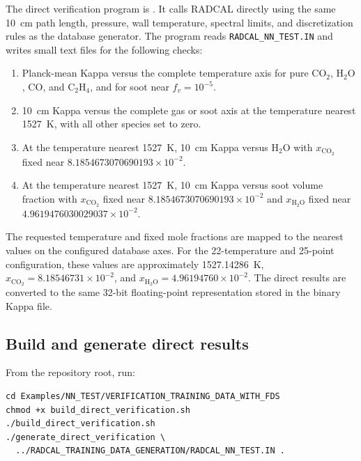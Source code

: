 \documentclass[11pt]{article}
\begin{document}
The direct verification program is
. It calls RADCAL directly using the same
10~cm path length, pressure, wall temperature, spectral limits, and
discretization rules as the database generator. The program reads
\texttt{RADCAL\_NN\_TEST.IN} and writes small text files for the following
checks:

\begin{enumerate}
   \item Planck-mean Kappa versus the complete temperature axis for pure
         \(\mathrm{CO_2}\), \(\mathrm{H_2O}\), \(\mathrm{CO}\), and
         \(\mathrm{C_2H_4}\), and for soot near \(f_v=10^{-5}\).
   \item 10~cm Kappa versus the complete gas or soot axis at the temperature
         nearest 1527~K, with all other species set to zero.
   \item At the temperature nearest 1527~K, 10~cm Kappa versus
         \(\mathrm{H_2O}\) with
         \(x_{\mathrm{CO_2}}\) fixed near
         \(8.1854673070690193\times10^{-2}\).
   \item At the temperature nearest 1527~K, 10~cm Kappa versus soot volume
         fraction with \(x_{\mathrm{CO_2}}\) fixed near
         \(8.1854673070690193\times10^{-2}\) and
         \(x_{\mathrm{H_2O}}\) fixed near
         \(4.9619476030029037\times10^{-2}\).
\end{enumerate}

The requested temperature and fixed mole fractions are mapped to the nearest
values on the configured database axes. For the 22-temperature and 25-point
configuration, these values are approximately 1527.14286~K,
\(x_{\mathrm{CO_2}}=8.18546731\times10^{-2}\), and
\(x_{\mathrm{H_2O}}=4.96194760\times10^{-2}\). The direct results are converted
to the same 32-bit floating-point representation stored in the binary Kappa
file.

\subsection{Build and generate direct results}

From the repository root, run:

\begin{verbatim}
cd Examples/NN_TEST/VERIFICATION_TRAINING_DATA_WITH_FDS
chmod +x build_direct_verification.sh
./build_direct_verification.sh
./generate_direct_verification \
  ../RADCAL_TRAINING_DATA_GENERATION/RADCAL_NN_TEST.IN .
\end{verbatim}
\end{document}
